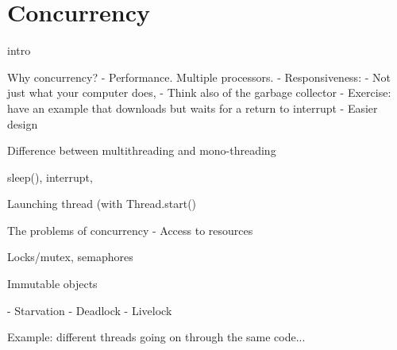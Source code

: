 
\section{Concurrency}
\label{sec:concurrency}

intro

Why concurrency?
  - Performance. Multiple processors.
  - Responsiveness: 
    - Not just what your computer does, 
    - Think also of the garbage collector
    - Exercise: have an example that downloads but waits for a return
      to interrupt
  - Easier design


Difference between multithreading and mono-threading

sleep(), interrupt, 

Launching thread (with Thread.start()

The problems of concurrency
  - Access to resources

Locks/mutex, semaphores

Immutable objects

    - Starvation
    - Deadlock
    - Livelock


Example: different threads going on through the same code...

